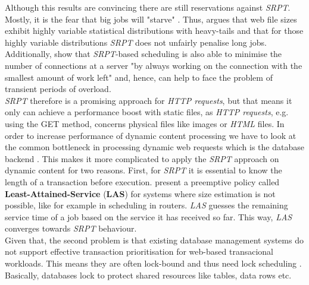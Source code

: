 \documentclass[
  a4paper,               %
  twoside,               %
  headings=small,        %
  DIV=12,                %
  BCOR=1cm,              %
  headinclude=true,      %
  footinclude=true,      %
  numbers=noenddot,      %
  11pt]{scrartcl}        %
\begin{document}
Although this results are convincing there are still reservations against \textit{SRPT}. Mostly, it is the fear that big jobs will "starve" \cite{schorederSchedule}. Thus, \cite{schorederSchedule} argues that web file sizes exhibit highly variable statistical distributions with heavy-tails and that for those highly variable distributions \textit{SRPT} does not unfairly penalise long jobs. Additionally, \cite{schorederSchedule} show that \textit{SRPT}-based scheduling is also able to minimise the number of connections at a server "by always working on the connection with the smallest amount of work left" \cite{schorederSchedule} and, hence, can help to face the problem of transient periods of overload.\\
\textit{SRPT} therefore is a promising approach for \textit{HTTP requests}, but that means it only can achieve a performance boost with static files, as \textit{HTTP requests}, e.g. using the GET method, concerns physical files like images or \textit{HTML} files. In order to increase performance of dynamic content processing we have to look at the common bottleneck in processing dynamic web requests which is the database backend \cite{McWherter}. This makes it more complicated to apply the \textit{SRPT} approach on dynamic content for two reasons.  First, for \textit{SRPT} it is essential to know the length of a transaction before execution. \cite{schorederSchedule} present a preemptive policy called \textbf{Least-Attained-Service} (\textbf{LAS}) for systems where size estimation is not possible, like for example in scheduling in routers. \textit{LAS} guesses the remaining service time of a job based on the service it has received so far. This way, \textit{LAS} converges towards \textit{SRPT} behaviour.\\
Given that, the second problem is that existing database management systems do not support effective transaction prioritisation for web-based transacional workloads. This means they are often lock-bound and thus need lock scheduling \cite{McWherter}. Basically, databases lock to protect shared resources like tables, data rows etc.\\
\end{document}
